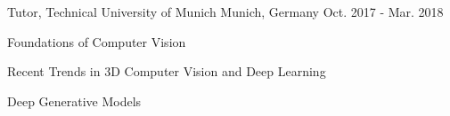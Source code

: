 


\begin{cventries}


\cventry
{} %
{Tutor, Technical University of Munich} %
{Munich, Germany} %
{Oct. 2017 - Mar. 2018} %
{ %
\begin{cvitems}
\item {Foundations of Computer Vision}
\item {Recent Trends in 3D Computer Vision and Deep Learning}
\item {Deep Generative Models}
\end{cvitems}
}


\end{cventries}
